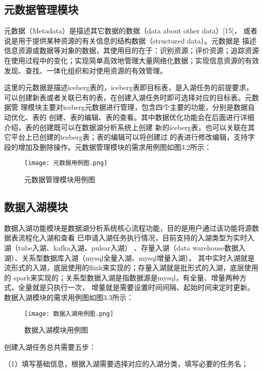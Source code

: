 \subsection{元数据管理模块}

元数据（Metadata）是描述其它数据的数据（data about other data）[15]，
或者说是用于提供某种资源的有关信息的结构数据（structured data）。元数据是
描述信息资源或数据等对象的数据，其使用目的在于：识别资源；评价资源；追踪资源
在使用过程中的变化；实现简单高效地管理大量网络化数据；实现信息资源的有效发现、查找、一体化组织和对使用资源的有效管理。

这里的元数据是描述iceberg表的，iceberg表即目标表，是入湖任务的前提要求，
可以创建新表或者关联已有的表，在创建入湖任务时即可选择对应的目标表。元数据管
理模块主要对iceberg元数据进行管理，包含四个主要的功能，分别是数据自动优化、表的
创建、表的编辑、表的查看。其中数据优化功能会在后面进行详细介绍，表的创建既可以在数据湖分析系统上创建
新的iceberg表，也可以关联在其它平台上已创建的iceberg表；表的编辑可以将创建过
的表进行修改编辑，支持字段的增加及删除操作。元数据管理模块的需求用例图如图3.2所示：

\begin{figure}[h]
  \centering
  \texttt{[image: 元数据用例图.png]}
  \caption{元数据管理模块用例图}
  \label{fig:badge}
\end{figure}

\subsection{数据入湖模块}

数据入湖功能模块是数据湖分析系统核心流程功能，目的是用户通过该功能将源数据表流程化入湖和查看
已申请入湖任务执行情况，目前支持的入湖类型为实时入湖（tube入湖、kafka入湖、pulsar入湖）
、存量入湖（data warehouse数据入湖）、关系型数据库入湖（mysql全量入湖、mysql增量入湖）。
其中实时入湖就是流形式的入湖，底层使用的flink来实现的；存量入湖就是批形式的入湖，底层使用的
spark来实现的；关系型数据入湖是指数据源是mysql，有全量、增量两种方式，全量就是只执行一次，
增量就是需要设置时间间隔、起始时间来定时更新。数据入湖模块的需求用例图如图3.3所示：

\begin{figure}[h]
  \centering
  \texttt{[image: 数据入湖用例图.png]}
  \caption{数据入湖模块用例图}
  \label{fig:badge}
\end{figure}

创建入湖任务总共需要五步：

（1）填写基础信息，根据入湖需要选择对应的入湖分类，填写必要的任务名；

